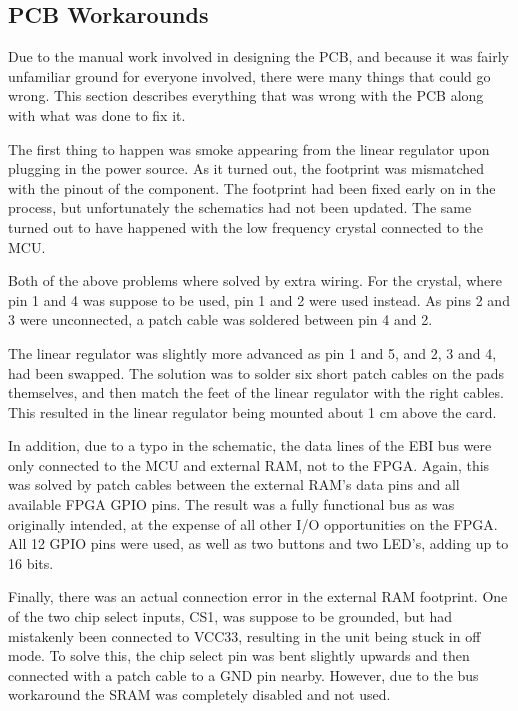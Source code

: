 
\subsection{PCB Workarounds}

Due to the manual work involved in designing the PCB, and because it was fairly
unfamiliar ground for everyone involved, there were many things that could go
wrong. This section describes everything that was wrong with the PCB along with
what was done to fix it.

The first thing to happen was smoke appearing from the linear regulator upon
plugging in the power source. As it turned out, the footprint was mismatched
with the pinout of the component. The footprint had been fixed early on in the
process, but unfortunately the schematics had not been updated. The same turned
out to have happened with the low frequency crystal connected to the MCU.

Both of the above problems where solved by extra wiring. For the crystal, where
pin 1 and 4 was suppose to be used, pin 1 and 2 were used instead. As pins 2 and
3 were unconnected, a patch cable was soldered between pin 4 and 2.




The linear regulator was slightly more advanced as pin 1 and 5, and 2, 3 and 4,
had been swapped. The solution was to solder six short patch cables on the pads
themselves, and then match the feet of the linear regulator with the right
cables. This resulted in the linear regulator being mounted about 1 cm above the
card.




In addition, due to a typo in the schematic, the data lines of the EBI bus were
only connected to the MCU and external RAM, not to the FPGA. Again, this was
solved by patch cables between the external RAM's data pins and all available
FPGA GPIO pins. The result was a fully functional bus as was originally
intended, at the expense of all other I/O opportunities on the FPGA. All 12 GPIO
pins were used, as well as two buttons and two LED's, adding up to 16 bits.




Finally, there was an actual connection error in the external RAM footprint.
One of the two chip select inputs, CS1, was suppose to be grounded, but had
mistakenly been connected to VCC33, resulting in the unit being stuck in off
mode. To solve this, the chip select pin was bent slightly upwards and then
connected with a patch cable to a GND pin nearby. However, due to the bus
workaround the SRAM was completely disabled and not used.

